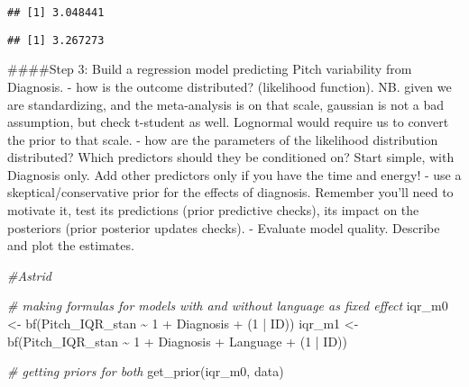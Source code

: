 \documentclass[
]{article}
\newenvironment{Shaded}{\begin{snugshade}}{\end{snugshade}}
\newcommand{\AttributeTok}[1]{\textcolor[rgb]{0.77,0.63,0.00}{#1}}
\newcommand{\CommentTok}[1]{\textcolor[rgb]{0.56,0.35,0.01}{\textit{#1}}}
\newcommand{\DecValTok}[1]{\textcolor[rgb]{0.00,0.00,0.81}{#1}}
\newcommand{\FunctionTok}[1]{\textcolor[rgb]{0.00,0.00,0.00}{#1}}
\newcommand{\NormalTok}[1]{#1}
\newcommand{\OtherTok}[1]{\textcolor[rgb]{0.56,0.35,0.01}{#1}}
\newcommand{\SpecialCharTok}[1]{\textcolor[rgb]{0.00,0.00,0.00}{#1}}
\newcommand{\StringTok}[1]{\textcolor[rgb]{0.31,0.60,0.02}{#1}}
\begin{document}
\begin{verbatim}
## [1] 3.048441
\end{verbatim}

\begin{Shaded}
\end{Shaded}

\begin{verbatim}
## [1] 3.267273
\end{verbatim}

\#\#\#\#Step 3: Build a regression model predicting Pitch variability
from Diagnosis. - how is the outcome distributed? (likelihood function).
NB. given we are standardizing, and the meta-analysis is on that scale,
gaussian is not a bad assumption, but check t-student as well. Lognormal
would require us to convert the prior to that scale. - how are the
parameters of the likelihood distribution distributed? Which predictors
should they be conditioned on? Start simple, with Diagnosis only. Add
other predictors only if you have the time and energy! - use a
skeptical/conservative prior for the effects of diagnosis. Remember
you'll need to motivate it, test its predictions (prior predictive
checks), its impact on the posteriors (prior posterior updates checks).
- Evaluate model quality. Describe and plot the estimates.

\begin{Shaded}
\begin{Highlighting}[]
\CommentTok{\#Astrid}

\CommentTok{\# making formulas for models with and without language as fixed effect}
\NormalTok{iqr\_m0 }\OtherTok{\textless{}{-}} \FunctionTok{bf}\NormalTok{(Pitch\_IQR\_stan }\SpecialCharTok{\textasciitilde{}} \DecValTok{1} \SpecialCharTok{+}\NormalTok{ Diagnosis }\SpecialCharTok{+}\NormalTok{ (}\DecValTok{1} \SpecialCharTok{|}\NormalTok{ ID))}
\NormalTok{iqr\_m1 }\OtherTok{\textless{}{-}} \FunctionTok{bf}\NormalTok{(Pitch\_IQR\_stan }\SpecialCharTok{\textasciitilde{}} \DecValTok{1} \SpecialCharTok{+}\NormalTok{ Diagnosis }\SpecialCharTok{+}\NormalTok{ Language }\SpecialCharTok{+}\NormalTok{ (}\DecValTok{1} \SpecialCharTok{|}\NormalTok{ ID))}

\CommentTok{\# getting priors for both}
\FunctionTok{get\_prior}\NormalTok{(iqr\_m0, data)}
\end{Highlighting}
\end{Shaded}
\end{document}
